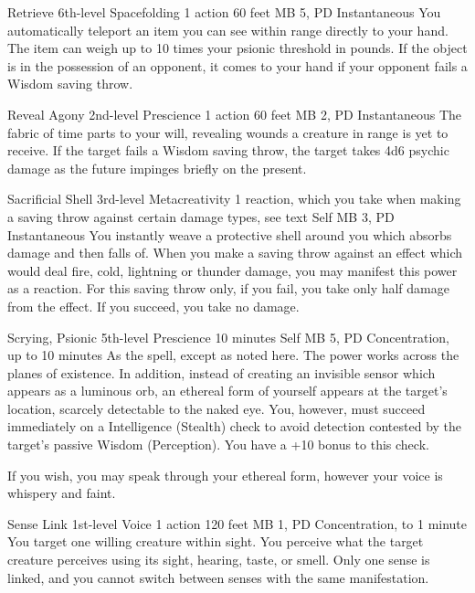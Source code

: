 \DndPowerHeader%
  {Retrieve}
  {6th-level Spacefolding}
  {1 action}
  {60 feet}
  {MB 5, PD \lvlsix}
  {Instantaneous}
  You automatically teleport an item you can see within range
  directly to your hand.
  The item can weigh up to
  10 times your psionic threshold in pounds.
  If the object is in the possession of an opponent,
  it comes to your hand if your opponent
  fails a Wisdom saving throw.

\DndPowerHeader%
  {Reveal Agony}
  {2nd-level Prescience}
  {1 action}
  {60 feet}
  {MB 2, PD \lvltwo}
  {Instantaneous}
  The fabric of time parts to your will,
  revealing wounds a creature in range is yet to receive.
  If the target fails a Wisdom saving throw,
  the target takes 4d6 psychic damage as the future
  impinges briefly on the present.

\DndPowerHeader%
  {Sacrificial Shell}
  {3rd-level Metacreativity}
  {1 reaction, which you take when making a saving throw
    against certain damage types, see text}
  {Self}
  {MB 3, PD \lvlthree}
  {Instantaneous}
You instantly weave a protective shell around you
which absorbs damage and then falls of.
When you make a saving throw against an effect
which would deal fire, cold, lightning or thunder damage,
you may manifest this power as a reaction.
For this saving throw only,
if you fail, you take only half damage from the effect.
If you succeed, you take no damage.

\DndPowerHeader%
  {Scrying, Psionic}
  {5th-level Prescience}
  {10 minutes}
  {Self}
  {MB 5, PD \lvlfive}
  {Concentration, up to 10 minutes}
As the  spell, except as noted here.
The power works across the planes of existence.
In addition,
instead of creating an invisible sensor which appears
as a luminous orb,
an ethereal form of yourself appears at the target's location,
scarcely detectable to the naked eye.
You,
however,
must succeed immediately on a Intelligence (Stealth) check
to avoid detection contested by the target's passive
Wisdom (Perception).
You have a +10 bonus to this check.

If you wish,
you may speak through your ethereal form,
however your voice is whispery and faint.

\DndPowerHeader%
  {Sense Link}
  {1st-level Voice}
  {1 action}
  {120 feet}
  {MB 1, PD \lvlone}
  {Concentration, to 1 minute}
  You target one willing creature within sight.
  You perceive what the target creature perceives using its sight,
  hearing, taste, or smell.
  Only one sense is linked,
  and you cannot switch between senses with the same manifestation.


